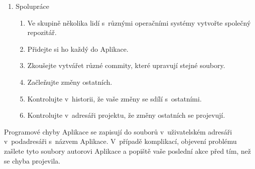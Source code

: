 \begin{enumerate}
\begin{enumerate}
	\end{enumerate}
	\item Spolupráce
	\begin{enumerate}
		\item Ve skupině několika lidí s~různými operačními systémy vytvořte společný repozitář.
		\item Přidejte si ho každý do Aplikace.
		\item Zkoušejte vytvářet různé commity, které upravují stejné soubory.
		\item Začleňujte změny ostatních.
		\item Kontrolujte v~historii, že vaše změny se sdílí s~ostatními.
		\item Kontrolujte v~adresáři projektu, že změny ostatních se projevují.
	\end{enumerate}
\end{enumerate}

Programové chyby Aplikace se zapisují do souborů v~uživatelském adresáři v~podadresáři s~názvem Aplikace. V~případě komplikací, objevení problému zašlete tyto soubory autorovi Aplikace a popiště vaše poslední akce před tím, než se chyba projevila.

